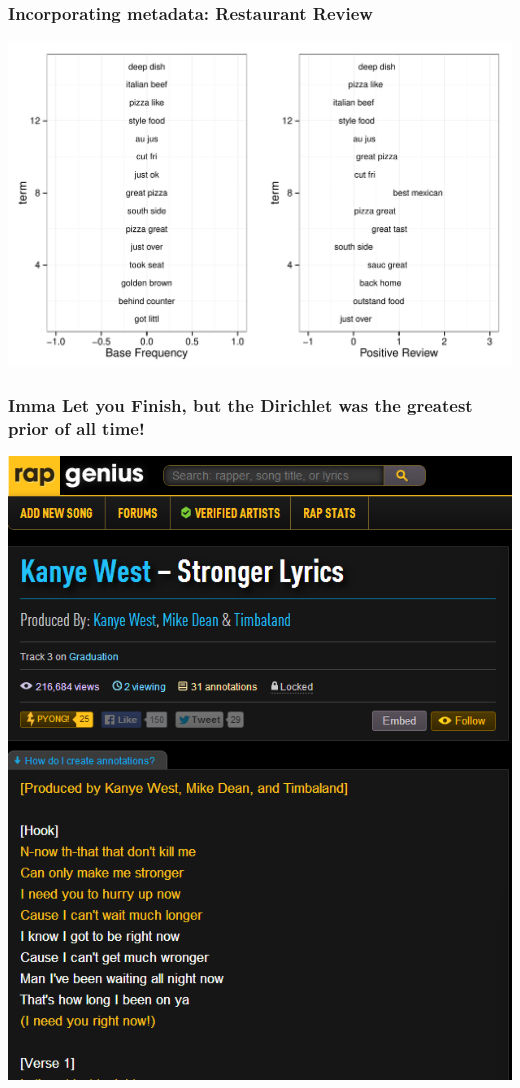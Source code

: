 \documentclass[presentation]{beamer}
\begin{document}
\begin{frame}
\frametitle{Incorporating metadata: Restaurant Review} %
\begin{center}
\includegraphics[width=1\textwidth]{Images/we8there_distortion.pdf}
\end{center}
\end{frame}


\begin{frame}
\frametitle{Imma Let you Finish, but the Dirichlet was the greatest prior of all time!}
\pause
\begin{center}
\includegraphics[height=1.0\textheight]{Images/lyrics_sample.png}
\end{center}
\end{frame}
\end{document}
